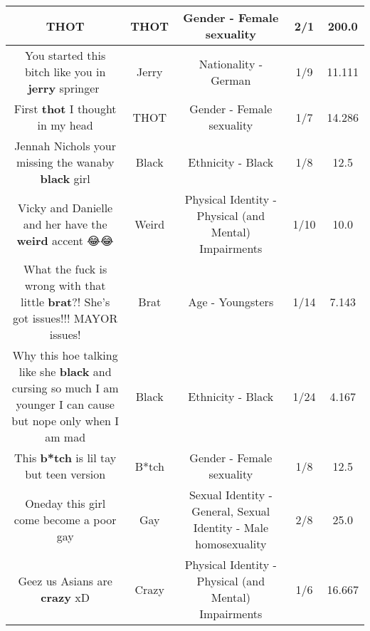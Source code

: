 \documentclass[11pt]{article}
\newlength\mylength
\begin{document}
\begin{center}
\begin{longtable}{|C{.65\mylength}|C{.30\mylength}|C{.12\mylength}|C{.12\mylength}|C{.12\mylength}|}
  \small THOT\normalsize   & THOT & Gender - Female sexuality & 2/1 & 200.0 \\  \hline
  \small You started this bitch like you in \textbf{jerry} springer🤣\normalsize   & Jerry & Nationality - German & 1/9 & 11.111 \\  \hline
  \small First \textbf{thot} I thought in my head\normalsize   & THOT & Gender - Female sexuality & 1/7 & 14.286 \\  \hline
  \small Jennah Nichols your missing the wanaby \textbf{black} girl\normalsize   & Black & Ethnicity - Black & 1/8 & 12.5 \\  \hline
  \small Vicky and  Danielle and her have the \textbf{weird} accent 😂😂\normalsize   & Weird & Physical Identity - Physical (and Mental) Impairments & 1/10 & 10.0 \\  \hline
  \small What the fuck is wrong with that little \textbf{brat}?! She's got issues!!! MAYOR issues!\normalsize   & Brat & Age - Youngsters & 1/14 & 7.143 \\  \hline
  \small Why this hoe talking like she \textbf{black} and cursing so much I am younger I can cause but nope only when I am mad\normalsize   & Black & Ethnicity - Black & 1/24 & 4.167 \\  \hline
  \small This \textbf{b*tch} is lil tay but teen version\normalsize   & B*tch & Gender - Female sexuality & 1/8 & 12.5 \\  \hline
  \small Oneday this girl come become a poor gay\normalsize   & Gay & Sexual Identity - General, Sexual Identity - Male homosexuality & 2/8 & 25.0 \\  \hline
  \small Geez us Asians are \textbf{crazy} xD\normalsize   & Crazy & Physical Identity - Physical (and Mental) Impairments & 1/6 & 16.667 \\  \hline

\end{longtable}
\end{center}
\end{document}
